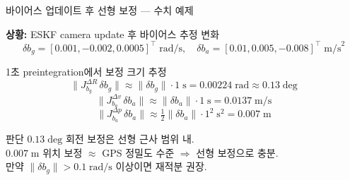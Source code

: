\begin{frame}[shrink=10]{바이어스 업데이트 후 선형 보정 — 수치 예제}

  \textbf{상황:} ESKF camera update 후 바이어스 추정 변화
  \[
    \delta b_g = [0.001, -0.002, 0.0005]^\top\;\text{rad/s},\quad
    \delta b_a = [0.01, 0.005, -0.008]^\top\;\text{m/s}^2
  \]

  \pause
  \begin{block}{1초 preintegration에서 보정 크기 추정}
    \[
      \|J_{b_g}^{\Delta R}\,\delta b_g\|
      \approx \|\delta b_g\| \cdot 1\;\text{s}
      = 0.00224\;\text{rad} \approx 0.13\;\text{deg}
    \]
    \[
      \|J_{b_a}^{\Delta v}\,\delta b_a\|
      \approx \|\delta b_a\| \cdot 1\;\text{s}
      = 0.0137\;\text{m/s}
    \]
    \[
      \|J_{b_a}^{\Delta p}\,\delta b_a\|
      \approx \tfrac{1}{2}\|\delta b_a\| \cdot 1^2\;\text{s}^2
      = 0.007\;\text{m}
    \]
  \end{block}

  \pause
  \begin{exampleblock}{판단}
    $0.13\;\text{deg}$ 회전 보정은 선형 근사 범위 내.\\
    $0.007\;\text{m}$ 위치 보정 $\approx$ GPS 정밀도 수준 $\Rightarrow$ 선형 보정으로 충분.\\
    만약 $\|\delta b_g\| > 0.1\;\text{rad/s}$ 이상이면 재적분 권장.
  \end{exampleblock}
\end{frame}

